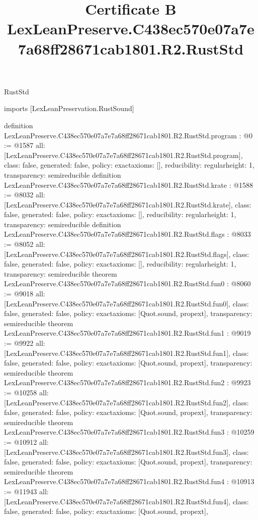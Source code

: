 \begin{lexlean}{RustStd}
\title{Certificate B LexLeanPreserve.C438ec570e07a7e7a68ff28671cab1801.R2.RustStd}
\begin{coremodule}
imports [LexLeanPreservation.RustSound]

definition LexLeanPreserve.C438ec570e07a7e7a68ff28671cab1801.R2.RustStd.program : @0 := @1587 {
  all: [LexLeanPreserve.C438ec570e07a7e7a68ff28671cab1801.R2.RustStd.program],
  class: false,
  generated: false,
  policy: exact{axioms: []},
  reducibility: regular{height: 1},
  transparency: semireducible
}
definition LexLeanPreserve.C438ec570e07a7e7a68ff28671cab1801.R2.RustStd.krate : @1588 := @8032 {
  all: [LexLeanPreserve.C438ec570e07a7e7a68ff28671cab1801.R2.RustStd.krate],
  class: false,
  generated: false,
  policy: exact{axioms: []},
  reducibility: regular{height: 1},
  transparency: semireducible
}
definition LexLeanPreserve.C438ec570e07a7e7a68ff28671cab1801.R2.RustStd.flags : @8033 := @8052 {
  all: [LexLeanPreserve.C438ec570e07a7e7a68ff28671cab1801.R2.RustStd.flags],
  class: false,
  generated: false,
  policy: exact{axioms: []},
  reducibility: regular{height: 1},
  transparency: semireducible
}
theorem LexLeanPreserve.C438ec570e07a7e7a68ff28671cab1801.R2.RustStd.fun0 : @8060 := @9018 {
  all: [LexLeanPreserve.C438ec570e07a7e7a68ff28671cab1801.R2.RustStd.fun0],
  class: false,
  generated: false,
  policy: exact{axioms: [Quot.sound, propext]},
  transparency: semireducible
}
theorem LexLeanPreserve.C438ec570e07a7e7a68ff28671cab1801.R2.RustStd.fun1 : @9019 := @9922 {
  all: [LexLeanPreserve.C438ec570e07a7e7a68ff28671cab1801.R2.RustStd.fun1],
  class: false,
  generated: false,
  policy: exact{axioms: [Quot.sound, propext]},
  transparency: semireducible
}
theorem LexLeanPreserve.C438ec570e07a7e7a68ff28671cab1801.R2.RustStd.fun2 : @9923 := @10258 {
  all: [LexLeanPreserve.C438ec570e07a7e7a68ff28671cab1801.R2.RustStd.fun2],
  class: false,
  generated: false,
  policy: exact{axioms: [Quot.sound, propext]},
  transparency: semireducible
}
theorem LexLeanPreserve.C438ec570e07a7e7a68ff28671cab1801.R2.RustStd.fun3 : @10259 := @10912 {
  all: [LexLeanPreserve.C438ec570e07a7e7a68ff28671cab1801.R2.RustStd.fun3],
  class: false,
  generated: false,
  policy: exact{axioms: [Quot.sound, propext]},
  transparency: semireducible
}
theorem LexLeanPreserve.C438ec570e07a7e7a68ff28671cab1801.R2.RustStd.fun4 : @10913 := @11943 {
  all: [LexLeanPreserve.C438ec570e07a7e7a68ff28671cab1801.R2.RustStd.fun4],
  class: false,
  generated: false,
  policy: exact{axioms: [Quot.sound, propext]},
}
\end{coremodule}
\end{lexlean}
